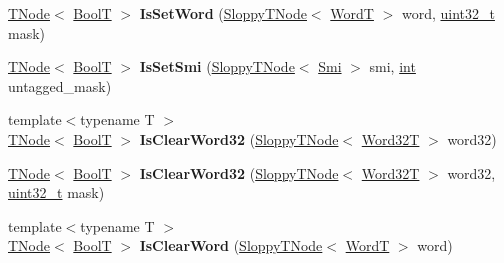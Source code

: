 \begin{DoxyCompactItemize}
\mbox{\hyperlink{classv8_1_1internal_1_1compiler_1_1TNode}{T\+Node}}$<$ \mbox{\hyperlink{structv8_1_1internal_1_1BoolT}{BoolT}} $>$ {\bfseries Is\+Set\+Word} (\mbox{\hyperlink{classv8_1_1internal_1_1compiler_1_1SloppyTNode}{Sloppy\+T\+Node}}$<$ \mbox{\hyperlink{structv8_1_1internal_1_1WordT}{WordT}} $>$ word, \mbox{\hyperlink{classuint32__t}{uint32\+\_\+t}} mask)
\item 
\mbox{\label{classv8_1_1internal_1_1CodeStubAssembler_ac6de190314ac93509138bee977c07515}} 
\mbox{\hyperlink{classv8_1_1internal_1_1compiler_1_1TNode}{T\+Node}}$<$ \mbox{\hyperlink{structv8_1_1internal_1_1BoolT}{BoolT}} $>$ {\bfseries Is\+Set\+Smi} (\mbox{\hyperlink{classv8_1_1internal_1_1compiler_1_1SloppyTNode}{Sloppy\+T\+Node}}$<$ \mbox{\hyperlink{classv8_1_1internal_1_1Smi}{Smi}} $>$ smi, \mbox{\hyperlink{classint}{int}} untagged\+\_\+mask)
\item 
\mbox{\label{classv8_1_1internal_1_1CodeStubAssembler_a5b2198d9f9e0405e20f5c32a0b75c3f8}} 
{\footnotesize template$<$typename T $>$ }\\\mbox{\hyperlink{classv8_1_1internal_1_1compiler_1_1TNode}{T\+Node}}$<$ \mbox{\hyperlink{structv8_1_1internal_1_1BoolT}{BoolT}} $>$ {\bfseries Is\+Clear\+Word32} (\mbox{\hyperlink{classv8_1_1internal_1_1compiler_1_1SloppyTNode}{Sloppy\+T\+Node}}$<$ \mbox{\hyperlink{structv8_1_1internal_1_1Word32T}{Word32T}} $>$ word32)
\item 
\mbox{\label{classv8_1_1internal_1_1CodeStubAssembler_aa7b0552d68f5b2b213eefe9bde977d7f}} 
\mbox{\hyperlink{classv8_1_1internal_1_1compiler_1_1TNode}{T\+Node}}$<$ \mbox{\hyperlink{structv8_1_1internal_1_1BoolT}{BoolT}} $>$ {\bfseries Is\+Clear\+Word32} (\mbox{\hyperlink{classv8_1_1internal_1_1compiler_1_1SloppyTNode}{Sloppy\+T\+Node}}$<$ \mbox{\hyperlink{structv8_1_1internal_1_1Word32T}{Word32T}} $>$ word32, \mbox{\hyperlink{classuint32__t}{uint32\+\_\+t}} mask)
\item 
\mbox{\label{classv8_1_1internal_1_1CodeStubAssembler_abfc33964ffa544d094b695b2935dbac5}} 
{\footnotesize template$<$typename T $>$ }\\\mbox{\hyperlink{classv8_1_1internal_1_1compiler_1_1TNode}{T\+Node}}$<$ \mbox{\hyperlink{structv8_1_1internal_1_1BoolT}{BoolT}} $>$ {\bfseries Is\+Clear\+Word} (\mbox{\hyperlink{classv8_1_1internal_1_1compiler_1_1SloppyTNode}{Sloppy\+T\+Node}}$<$ \mbox{\hyperlink{structv8_1_1internal_1_1WordT}{WordT}} $>$ word)

\end{DoxyCompactItemize}
